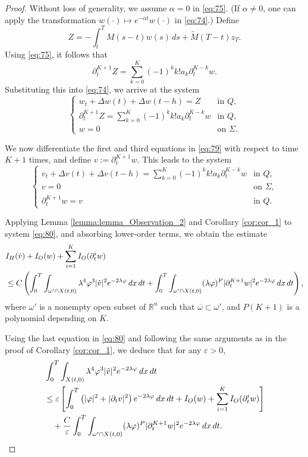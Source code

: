\documentclass[12pt]{article}
\theoremstyle{plain}
\theoremstyle{definition}
\begin{document}
\begin{proof}
Without loss of generality, we assume $\alpha = 0$ in \eqref{eq:75}. (If $\alpha \neq 0$, one can apply the transformation $w(\cdot) \mapsto e^{-\alpha t} w(\cdot)$ in \eqref{eq:74}.) Define
\[
Z = -\int_t^T M(s - t)w(s)\,ds + \widetilde{M}(T - t)z_T.
\]
Using \eqref{eq:75}, it follows that
\[
\partial_t^{K+1} Z = \sum_{k=0}^K (-1)^k k! a_k \partial_t^{K - k} w.
\]
Substituting this into \eqref{eq:74}, we arrive at the system
\begin{equation}
\label{eq:79}
\begin{cases}
    w_t + \Delta w(t) + \Delta w(t-h) = Z & \text{in } Q, \\
\partial_t^{K+1} Z = \sum_{k=0}^K (-1)^k k! a_k \partial_t^{K - k} w & \text{in } Q, \\
w = 0 & \text{on } \Sigma.
\end{cases}
\end{equation}

We now differentiate the first and third equations in \eqref{eq:79} with respect to time $K+1$ times, and define $v := \partial_t^{K+1} w$. This leads to the system
\begin{equation}
\label{eq:80}
\begin{cases}
    v_t + \Delta v(t) + \Delta v(t-h) = \sum_{k=0}^K (-1)^k k! a_k \partial_t^{K - k} w & \text{in } Q, \\
v = 0 & \text{on } \Sigma, \\
\partial_t^{K+1} w = v & \text{in } Q.
\end{cases}
\end{equation}

Applying Lemma \ref{lemma:lemma_Observation_2} and Corollary \ref{cor:cor_1} to system \eqref{eq:80}, and absorbing lower-order terms, we obtain the estimate
\begin{align}\label{eq:81}
   & I_H(\dot{v}) + I_O(w) + \sum_{i=1}^K I_O(\partial_t^i w) \notag\\
&\leq C \left( \int_0^T \int_{\omega' \cap X(t,0)} \lambda^4 \varphi^3 |\hat{v}|^2 e^{-2\lambda \varphi} \,dx\,dt + \int_0^T \int_{\omega' \cap X(t,0)} (\lambda \varphi)^P |\partial_t^{K+1} w|^2 e^{-2\lambda \varphi} \,dx\,dt \right),
\end{align}
where $\omega'$ is a nonempty open subset of $\mathbb{R}^n$ such that $\overline{\omega} \subset \omega'$, and $P(K+1)$ is a polynomial depending on $K$.

Using the last equation in \eqref{eq:80} and following the same arguments as in the proof of Corollary \ref{cor:cor_1}, we deduce that for any $\varepsilon > 0$,
\begin{align}
\label{eq:82}
& \int_0^T \int_{X(t,0)} \lambda^4 \varphi^3 |\hat{v}|^2 e^{-2\lambda \varphi} \, dx \, dt \notag \\
& \leq \varepsilon \left[ \int_0^T \left( |\varphi|^2 + |\partial_t v|^2 \right) e^{-2\lambda \varphi} \, dx \, dt + I_O(w) + \sum_{i=1}^K I_O(\partial_t^i w) \right] \notag \\
& \quad + \frac{C}{\varepsilon} \int_0^T \int_{\omega' \cap X(t,0)} (\lambda \varphi)^P |\partial_t^{K+1} w|^2 e^{-2\lambda \varphi} \, dx \, dt.
\end{align}


\end{proof}
\end{document}
